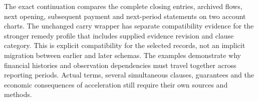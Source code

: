 The exact continuation compares the complete closing entries, archived flows,
next opening, subsequent payment and next-period statements on two account
charts. The unchanged carry wrapper has separate compatibility evidence for
the stronger remedy profile that includes supplied evidence revision and
clause category. This is explicit compatibility for the selected records,
not an implicit migration between earlier and later schemas. The examples
demonstrate why financial histories and observation dependencies must travel
together across reporting periods. Actual terms, several simultaneous
clauses, guarantees and the economic consequences of acceleration still
require their own sources and methods.
